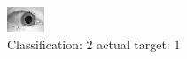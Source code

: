 \begin{figure}[h!]
\begin{center}
\includegraphics[width=0.60\columnwidth]{figures/ID1461_class_2_target_1.png}
\end{center}
\caption{ Classification: 2 actual target: 1}
\label{fig:ID1461_class_2_target_1}
\end{figure}
